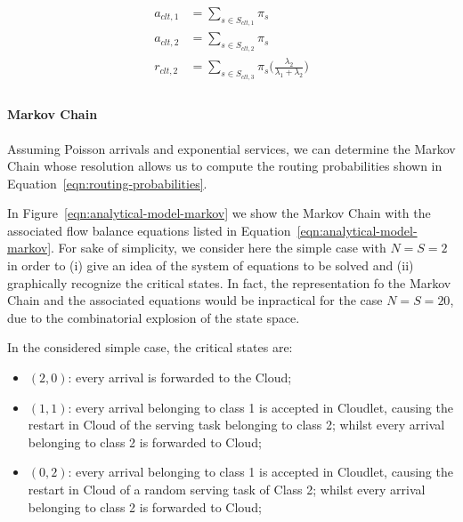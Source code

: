 \begin{equation} 
\begin{split}
a_{clt,1} & = \sum_{s\in S_{clt,1}} \pi_{s} \\
a_{clt,2} & = \sum_{s\in S_{clt,2}} \pi_{s} \\
r_{clt,2} & = \sum_{s\in S_{clt,3}} \pi_{s} \Big(\frac{\lambda_{2}}{\lambda_{1}+\lambda_{2}}\Big) \\
\end{split}
\label{eqn:routing-probabilities}
\end{equation}


\paragraph{Markov Chain}
Assuming Poisson arrivals and exponential services, we can determine the Markov Chain whose resolution allows us to compute the routing probabilities shown in Equation~\ref{eqn:routing-probabilities}.

In Figure~\ref{eqn:analytical-model-markov} we show the Markov Chain with the associated flow balance equations listed in Equation~\ref{eqn:analytical-model-markov}.
For sake of simplicity, we consider here the simple case with $N=S=2$ in order to (i) give an idea of the system of equations to be solved and (ii) graphically recognize the critical states. In fact, the representation fo the Markov Chain and the associated equations would be inpractical for the case $N=S=20$, due to the combinatorial explosion of the state space.

In the considered simple case, the critical states are:

\begin{itemize}
	\item $(2,0)$: every arrival is forwarded to the Cloud;
	
	\item $(1,1)$: every arrival belonging to class 1 is accepted in Cloudlet, causing the restart in Cloud of the serving task belonging to class 2; whilst every arrival belonging to class 2 is forwarded to Cloud;
	
	\item $(0,2)$: every arrival belonging to class 1 is accepted in Cloudlet, causing the restart in Cloud of a random serving task of Class 2; whilst every arrival belonging to class 2 is forwarded to Cloud;
\end{itemize}

